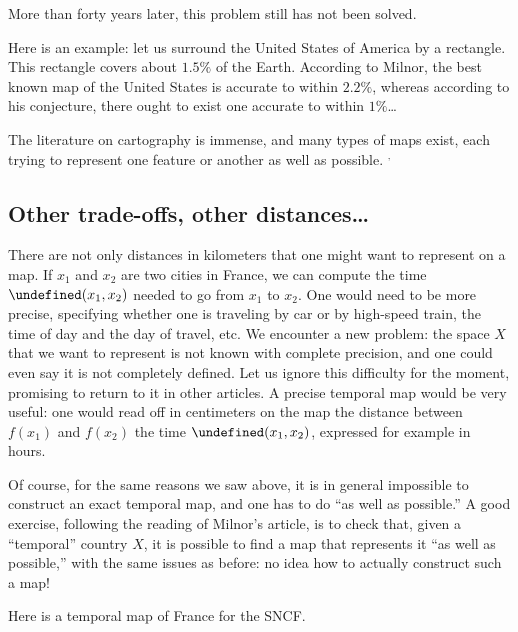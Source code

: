 \documentclass{amsart}
\let\time=\undefined
\begin{document}
More than forty years later, this problem still has not been solved.

Here is an example: let us surround the United States of America by a
rectangle. This rectangle covers about $1.5\%$ of the Earth.%
According to Milnor, the best known map of the United States is
accurate to within $2.2\%$, whereas according to his conjecture, there
ought to exist one accurate to within $1\%$\dots

The literature on cartography is immense, and many types of maps
exist, each trying to represent one feature or another as well as
possible.%
$^,$%
%

\subsection{Other trade-offs, other distances\dots}

There are not only distances in kilometers that one might want to
represent on a map. If $x_1$ and $x_2$ are two cities in France, we
can compute the time $\time(x_1,x_2)$ needed to go from $x_1$ to
$x_2$. One would need to be more precise, specifying whether one is
traveling by car or by high-speed train, the time of day and the day
of travel, etc. We encounter a new problem: the space $X$ that we want
to represent is not known with complete precision, and one could even
say it is not completely defined. Let us ignore this difficulty for
the moment, promising to return to it in other articles. A precise
temporal map would be very useful: one would read off in centimeters
on the map the distance between $f(x_1)$ and $f(x_2)$ the time
$\time(x_1,x_2)$, expressed for example in hours.

Of course, for the same reasons we saw above, it is in general
impossible to construct an exact temporal map, and one has to do ``as
well as possible.'' A good exercise, following the reading of Milnor’s
article, is to check that, given a ``temporal'' country $X$, it is
possible to find a map that represents it ``as well as possible,''
with the same issues as before: no idea how to actually construct such
a map!

Here is a temporal map of France for the SNCF.%
\end{document}
